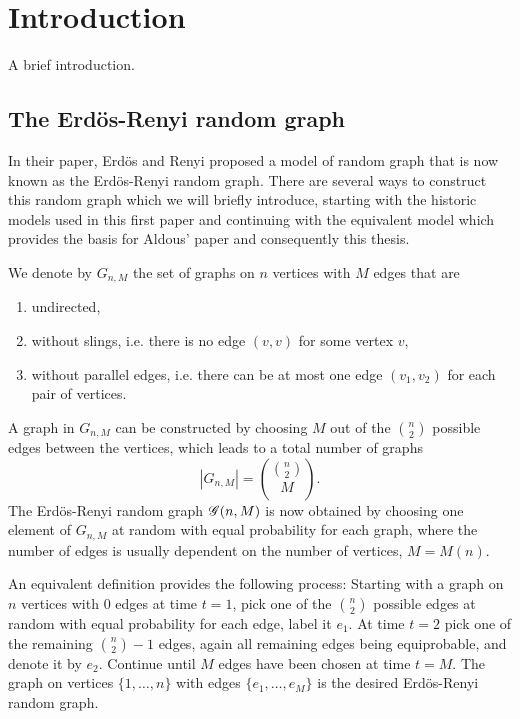
\chapter{Introduction}

A brief introduction.
\lipsum[100]

\section{The Erdös-Renyi random graph}

In their paper, Erdös and Renyi proposed a model of random graph that is now known as the Erdös-Renyi random graph.
There are several ways to construct this random graph which we will briefly introduce,
starting with the historic models used in this first paper 
and continuing with the equivalent model which provides the basis for Aldous' paper and consequently this thesis.

We denote by $G_{n,M}$ the set of graphs on $n$ vertices with $M$ edges that are
\begin{enumerate}
	\item undirected,
	\item without slings, i.e. there is no edge $(v,v)$ for some vertex $v$,
	\item without parallel edges, i.e. there can be at most one edge $(v_1, v_2)$ for each pair of vertices.
\end{enumerate}
A graph in $G_{n,M}$ can be constructed by choosing $M$ out of the $\binom{n}{2}$ possible edges between the vertices,
which leads to a total number of graphs
\begin{equation}
	|G_{n,M}| = \binom{\binom{n}{2}}{M}.
\end{equation}
The Erdös-Renyi random graph $\mathscr{G}(n, M)$ is now obtained by choosing one element of $G_{n,M}$ at random
with equal probability for each graph, where the number of edges is usually dependent on the number of vertices, $M = M(n)$.

An equivalent definition provides the following process:
Starting with a graph on $n$ vertices with $0$ edges at time $t=1$, 
pick one of the $\binom{n}{2}$ possible edges at random with equal probability for each edge,
label it $e_1$.
At time $t=2$ pick one of the remaining $\binom{n}{2}-1$ edges, again all remaining edges being equiprobable,
and denote it by $e_2$.
Continue until $M$ edges have been chosen at time $t=M$.
The graph on vertices $\{1, \dots, n\}$ with edges $\{e_1, \dots, e_M\}$ is the desired Erdös-Renyi random graph.


